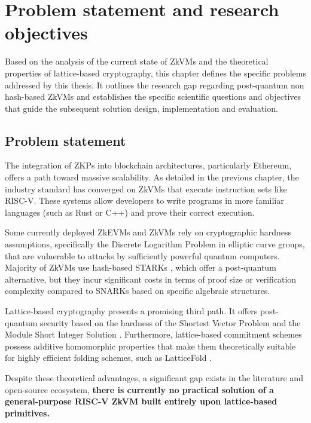 \chapter{Problem statement and research objectives}\label{chap:problem_statement}

Based on the analysis of the current state of ZkVMs and the theoretical
properties of lattice-based cryptography, this chapter defines the specific
problems addressed by this thesis. It outlines the research gap regarding
post-quantum non hash-based ZkVMs and establishes the specific scientific questions
and objectives that guide the subsequent solution design, implementation and evaluation.

\section{Problem statement}

The integration of ZKPs into blockchain architectures, particularly Ethereum,
offers a path toward massive scalability. As detailed in the previous chapter,
the industry standard has converged on ZkVMs that execute instruction sets
like RISC-V. These systems allow developers to write programs in more familiar
languages (such as Rust or C++) and prove their correct execution.

Some currently deployed ZkEVMs and ZkVMs rely on cryptographic hardness
assumptions, specifically the Discrete Logarithm Problem in elliptic curve
groups, that are vulnerable to attacks by sufficiently powerful quantum
computers. Majority of ZkVMs use hash-based STARKs \cite{STARK}, which offer a post-quantum
alternative, but they incur significant costs in terms of proof size or
verification complexity compared to SNARKs based on specific algebraic structures.

Lattice-based cryptography presents a promising third path. It offers
post-quantum security based on the hardness of the Shortest Vector Problem
and the Module Short Integer Solution \cite{AjtaiLattices, LatticeTutorial}.
Furthermore, lattice-based commitment schemes possess additive homomorphic
properties that make them theoretically suitable for highly efficient folding
schemes, such as LatticeFold \cite{LatticeFold}.

Despite these theoretical advantages, a significant gap exists in the
literature and open-source ecosystem, \textbf{there is currently no practical
	solution of a general-purpose RISC-V ZkVM built entirely upon lattice-based primitives.}

